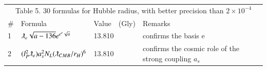 \documentclass[a4paper,9pt]{article}
\begin{document}
\begin{table}
\label{tab:5:table5}
  \hskip-2.0cm\begin{tabular}{llll}
    \toprule
    \multicolumn{4}{c}{Table 5. 30 formulas for Hubble radius, with better precision than $2 \times 10^{-4}$}                   \\
    \cmidrule(r){1-4}
   \#     & Formula     & Value~~(Gly) & Remarks \\
    \midrule    
    
   1 & $ \lambdabar_{e} \sqrt{a -136} e^{e^e \sqrt a}$ & 13.810 & confirms the basis e \\
  
   2 & $(l_P^2 \lambdabar_{e})a_s^2 N_L (\lambdabar_{CMB}/r_H)^6$ & 13.810 & confirms the cosmic role of the strong coupling $a_s$ \\
 

\end{tabular}
\end{table}
\end{document}
